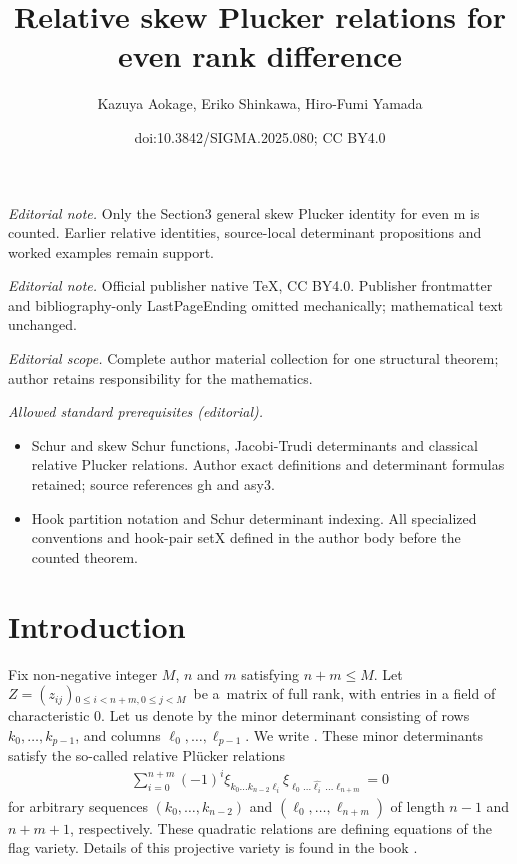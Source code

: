 \documentclass[10pt,a4paper]{amsart}
\title{Relative skew Plucker relations for even rank difference}
\author{Kazuya Aokage, Eriko Shinkawa, Hiro-Fumi Yamada}
\date{doi:10.3842/SIGMA.2025.080; CC BY4.0}
\numberwithin{equation}{section}
\begin{document}
\maketitle
\noindent\textit{Editorial note.} Only the Section3 general skew Plucker identity for even m is counted. Earlier relative identities, source-local determinant propositions and worked examples remain support.\par\medskip
\noindent\textit{Editorial note.} Official publisher native TeX, CC BY4.0. Publisher frontmatter and bibliography-only LastPageEnding omitted mechanically; mathematical text unchanged.\par\medskip
\noindent\textit{Editorial scope.} Complete author material collection for one structural theorem; author retains responsibility for the mathematics.\par\medskip
\noindent\textit{Allowed standard prerequisites (editorial).}\begin{itemize}
\item Schur and skew Schur functions, Jacobi-Trudi determinants and classical relative Plucker relations. Author exact definitions and determinant formulas retained; source references gh and asy3.
\item Hook partition notation and Schur determinant indexing. All specialized conventions and hook-pair setX defined in the author body before the counted theorem.
\end{itemize}\medskip
\section{Introduction}
Fix non-negative integer $M$, $n$ and $m$ satisfying $n+m\leq M$. Let
$Z={(z_{ij})}{}_{0\leq i<n+m, 0\leq j <M}$~be a~matrix of full rank, with entries in a field of characteristic $0$. Let us denote by  the minor determinant consisting of rows $k_0,\dots,k_{p-1}$, and columns $\ell_0,\dots,\ell_{p-1}$. We write . These minor determinants satisfy the so-called relative Pl\"ucker relations
\begin{gather*}
\sum_{i=0}^{n+m}{(-1)}^{i}\xi_{k_{0}\dots k_{n-2}\ell_{i}}\xi_{\ell_{0}\dots \widehat{\ell_{i}}\,\dots \ell_{n+m}}=0
\end{gather*}
for arbitrary sequences $(k_0,\dots,k_{n-2})$ and $(\ell_0,\dots,\ell_{n+m})$ of length $n-1$ and $n+m+1$, respectively. These quadratic relations are defining equations of the flag variety. Details of this projective variety is found in the book \cite{gh}.
\end{document}

